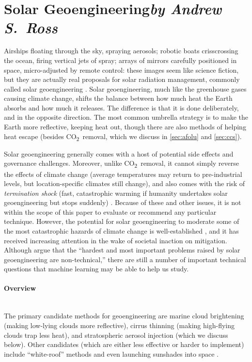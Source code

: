 \documentclass[11pt]{report}
\newcommand{\carbon}{CO\textsubscript{2}}
\newcommand{\Gap}{\texorpdfstring{\hfill}{}}
\begin{document}
\section{Solar Geoengineering\texorpdfstring{\hfill\textit{by Andrew S.~Ross}}{}}
\label{sec:geoengineering}

Airships floating through the sky, spraying aerosols; robotic boats crisscrossing the ocean, firing vertical jets of spray; arrays of mirrors carefully positioned in space, micro-adjusted by remote control: these images seem like science fiction, but they are actually real proposals for solar radiation management, commonly called solar geoengineering \cite{keith2000geoengineering,shepherd2009geoengineering,irvine2016overview,keith2018science}. Solar geoengineering, much like the greenhouse gases causing climate change, shifts the balance between how much heat the Earth absorbs and how much it releases. The difference is that it is done deliberately, and in the opposite direction. The most common umbrella strategy is to make the Earth more reflective, keeping heat out, though there are also methods of helping heat escape (besides \carbon~removal, which we discuss in \textsection\ref{sec:afolu} and \textsection\ref{sec:ccs}).

Solar geoengineering generally comes with a host of potential side effects and governance challenges. Moreover, unlike \carbon~removal, it cannot simply reverse the effects of climate change (average temperatures may return to pre-industrial levels, but location-specific climates still change), and also comes with the risk of \emph{termination shock} (fast, catastrophic warming if humanity undertakes solar geoengineering but stops suddenly) \cite{parker2018risk}. Because of these and other issues, it is not within the scope of this paper to evaluate or recommend any particular technique. However, the potential for solar geoengineering to moderate some of the most catastrophic hazards of climate change is well-established \cite{irvine2019halving}, and it has received increasing attention in the wake of societal inaction on mitigation. Although \cite{keith2018science} argue that the ``hardest and most important problems raised by solar geoengineering are non-technical,'' 
there are still a number of important technical questions that machine learning may be able to help us study.

\paragraph*{Overview}\Gap\mbox{}\\
The primary candidate methods for geoengineering are marine cloud brightening \cite{jones2009climate} (making low-lying clouds more reflective), cirrus thinning \cite{storelvmo2014cirrus} (making high-flying clouds trap less heat), and stratospheric aerosol injection \cite{rasch2008overview} (which we discuss below). Other candidates (which are either less effective or harder to implement) include ``white-roof'' methods \cite{akbari2012long} and even launching sunshades into space \cite{angel2006feasibility}.
\end{document}
